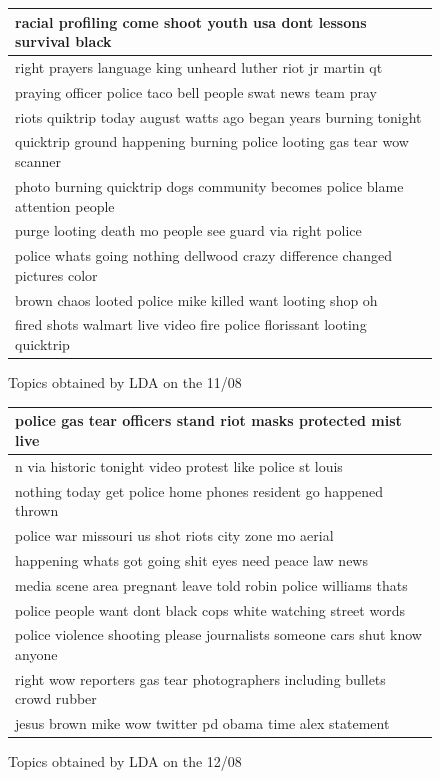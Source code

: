 \documentclass[a4paper,twoside,12pt,openright]{report}
\begin{document}
\begin{figure}[H]
  \centering
\begin{tabular}{l}
\hline
racial profiling come shoot youth usa dont lessons survival black \\ \hline
right prayers language king unheard luther riot jr martin qt \\ \hline
praying officer police taco bell people swat news team pray \\ \hline
riots quiktrip today august watts ago began years burning tonight \\ \hline
quicktrip ground happening burning police looting gas tear wow scanner \\ \hline
photo burning quicktrip dogs community becomes police blame attention people \\ \hline
purge looting death mo people see guard via right police \\ \hline
police whats going nothing dellwood crazy difference changed pictures color \\ \hline
brown chaos looted police mike killed want looting shop oh \\ \hline
fired shots walmart live video fire police florissant looting quicktrip \\ \hline
\end{tabular}
\caption{Topics obtained by LDA on the 11/08}
\end{figure}


\begin{figure}[H]
  \centering
\begin{tabular}{l}
\hline
police gas tear officers stand riot masks protected mist live \\ \hline
n via historic tonight video protest like police st louis \\ \hline
nothing today get police home phones resident go happened thrown \\ \hline
police war missouri us shot riots city zone mo aerial \\ \hline
happening whats got going shit eyes need peace law news \\ \hline
media scene area pregnant leave told robin police williams thats \\ \hline
police people want dont black cops white watching street words \\ \hline
police violence shooting please journalists someone cars shut know anyone \\ \hline
right wow reporters gas tear photographers including bullets crowd rubber \\ \hline
jesus brown mike wow twitter pd obama time alex statement \\ \hline
\end{tabular}
\caption{Topics obtained by LDA on the 12/08}
\end{figure}
\end{document}
